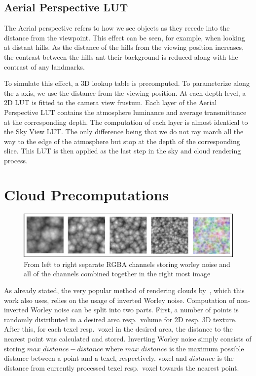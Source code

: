 \documentclass{ctuthesis}
\begin{document}
\subsection{Aerial Perspective LUT}
\label{aerial perspective}

The Aerial perspective refers to how we see objects as they recede into the distance from the viewpoint.
This effect can be seen, for example, when looking at distant hills. As the distance of the hills from
the viewing position increases, the contrast between the hills ant their background is reduced along 
with the contrast of any landmarks.

To simulate this effect, a 3D lookup table is precomputed. To parameterize along the z-axis, we use the 
distance from the viewing position. At each depth level, a 2D LUT is fitted to the camera view frustum.
Each layer of the Aerial Perspective LUT contains the atmosphere luminance and average transmittance at the corresponding depth. The 
computation of each layer is almost identical to the Sky View LUT. The only difference being that we do not ray march all
the way to the edge of the atmosphere but stop at the depth of the corresponding slice.
This LUT is then applied as the last step in the sky and cloud rendering process.


\section{Cloud Precomputations}
\label{Worley noise LUT}

\begin{figure}[h]
    \centering
    \includegraphics[width=1.0\textwidth]{media/worley_noise_high_res_showcase.png}
    \caption[Worley noise showcase]{From left to right separate RGBA channels storing worley noise and all of the
    channels combined together in the right most image}
\end{figure}

As already stated, the very popular method of rendering clouds by~\cite{schneider2015real}, which this work also uses,
relies on the usage of inverted Worley noise. Computation of non-inverted Worley noise can be split into two parts.
First, a number of points is randomly distributed in a desired area resp.~volume for 2D resp. 3D texture. 
After this, for each texel resp.~voxel in the desired area, the distance to the
nearest point was calculated and stored. Inverting Worley noise simply consists of storing 
$max\_distance - distance$ where $max\_distance$ is the maximum possible distance between a point
and a texel, respectively. voxel and $distance$ is the distance from currently processed texel resp.~voxel towards
the nearest point. 
\end{document}
